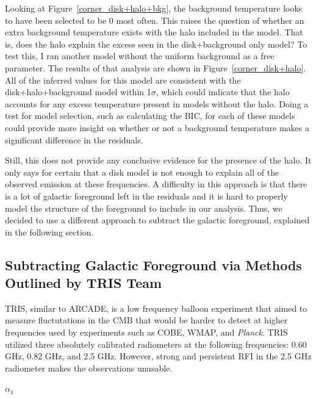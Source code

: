 \documentclass[letterpaper, 10pt]{article}
\begin{document}
Looking at Figure~\ref{corner_disk+halo+bkg}, the background temperature looks to have been selected to be 0 most often. This raises the question of whether an extra background temperature exists with the halo included in the model. That is, does the halo explain the excess seen in the disk+background only model? To test this, I ran another model without the uniform background as a free parameter. The results of that analysis are shown in Figure~\ref{corner_disk+halo}. All of the inferred values for this model are consistent with the disk+halo+background model within 1$\sigma$, which could indicate that the halo accounts for any excess temperature present in models without the halo. Doing a test for model selection, such as calculating the BIC, for each of these models could provide more insight on whether or not a background temperature makes a significant difference in the residuals. 

Still, this does not provide any conclusive evidence for the presence of the halo. It only says for certain that a disk model is not enough to explain all of the observed emission at these frequencies. A difficulty in this approach is that there is a lot of galactic foreground left in the residuals and it is hard to properly model the structure of the foreground to include in our analysis. Thus, we decided to use a different approach to subtract the galactic foreground, explained in the following section.

\subsection{Subtracting Galactic Foreground via Methods Outlined by TRIS Team}
TRIS, similar to ARCADE, is a low frequency balloon experiment that aimed to measure fluctutations in the CMB that would be harder to detect at higher frequencies used by experiments such as COBE, WMAP, and \emph{Planck}. TRIS utilized three absolutely calibrated radiometers at the following frequencies: 0.60 GHz, 0.82 GHz, and 2.5 GHz. However, strong and persistent RFI in the 2.5 GHz radiometer makes the observations unusable. 

$\alpha_{1}$
\end{document}
